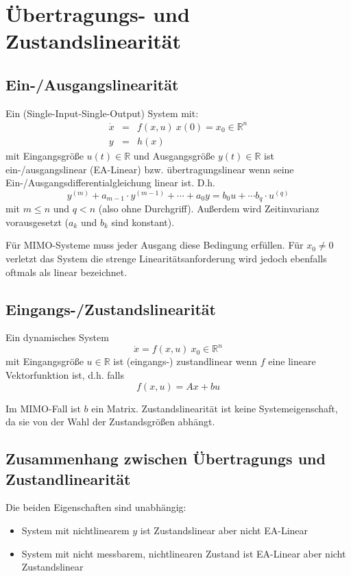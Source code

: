 \chapter{Übertragungs- und Zustandslinearität}
\section{Ein-/Ausgangslinearität}
Ein (Single-Input-Single-Output) System mit:
\begin{eqnarray}
    \dot{x} &=& f(x, u)\ x(0) =x_0 \in \mathbb{R}^n \\
    y &=& h(x)
\end{eqnarray}
mit Eingangsgröße $u(t) \in \mathbb{R}$ und Ausgangsgröße $y(t) \in \mathbb{R}$ ist
ein-/ausgangslinear (EA-Linear) bzw. übertragungslinear wenn seine 
Ein-/Ausgangsdifferentialgleichung linear ist. D.h.
\begin{equation}
    y^{(m)} + a_{m-1} \cdot y^{(m-1)} + \cdots + a_0 y =
    b_0 u + \cdots b_q \cdot u^{(q)}
\end{equation}
mit $m \leq n$ und $q < n$ (also ohne Durchgriff). Außerdem wird Zeitinvarianz
vorausgesetzt ($a_k$ und $b_k$ sind konstant).

Für MIMO-Systeme muss jeder Ausgang diese Bedingung erfüllen. Für $x_0 \neq 0$ verletzt
das System die strenge Linearitätsanforderung wird jedoch ebenfalls oftmals als linear
bezeichnet.

\section{Eingangs-/Zustandslinearität}
Ein dynamisches System
\begin{equation}
    \dot{x} = f(x, u)\ x_0 \in \mathbb{R}^n
\end{equation}
mit Eingangsgröße $u \in \mathbb{R}$ ist (eingangs-) zustandlinear wenn $f$ eine lineare
Vektorfunktion ist, d.h. falls
\begin{equation}
    f(x, u) = A x + b u
\end{equation}

Im MIMO-Fall ist $b$ ein Matrix. Zustandslinearität ist keine Systemeigenschaft, da
sie von der Wahl der Zustandsgrößen abhängt.

\section{Zusammenhang zwischen Übertragungs und Zustandlinearität}
Die beiden Eigenschaften sind unabhängig:
\begin{itemize}
    \item System mit nichtlinearem $y$ ist Zustandslinear aber nicht EA-Linear
    \item System mit nicht messbarem, nichtlinearen Zustand ist EA-Linear
        aber nicht Zustandslinear
\end{itemize}

